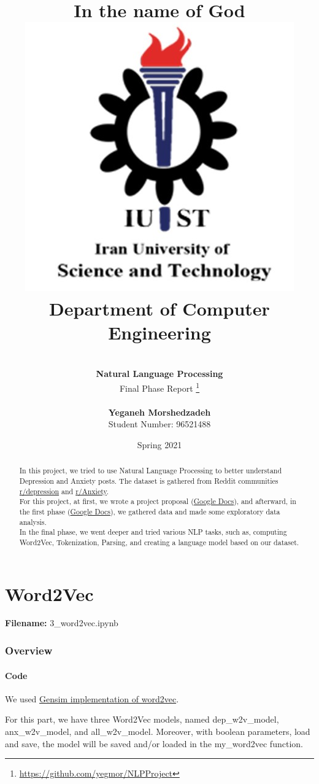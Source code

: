 \documentclass[12pt, a4paper]{article}
\title{
	{\Huge \textbf{In the name of God}}
	\\[20pt]
	\includegraphics[width=0.5\linewidth]{../assets/IUST_logo_color_eng.jpg} \\
	{\normalsize Department of Computer Engineering}
}
\author{
	\\[10pt]
	\textbf{{\LARGE Natural Language Processing}}
	\\[10pt]
	\LARGE Final Phase Report
	\thanks{\url{https://github.com/yegmor/NLPProject}}
	
	\\[30pt]
	\textbf{Yeganeh Morshedzadeh}
	\\[5pt]
	Student Number: 96521488
}
\date{Spring 2021}
\begin{document}
	
	\maketitle
	
	\clearpage
	\tableofcontents
	\newpage
	
	\listoffigures
	\newpage
	
	\listoftables
	\newpage
	
	\begin{abstract}
		In this project, we tried to use Natural Language Processing to better understand Depression and Anxiety posts. The dataset is gathered from Reddit communities \href{https://www.reddit.com/r/depression}{r/depression} and \href{https://www.reddit.com/r/Anxiety}{r/Anxiety}.
		\\[10pt]
		
		For this project, at first, we wrote a project proposal (\href{https://docs.google.com/document/d/1tHGEmEgn8-sp8MD72d8NjnZsq-GpVupzsMWgnqaGi-Y/edit?usp=sharing}{Google Docs}), and afterward, in the first phase (\href{https://docs.google.com/document/d/1Jc2ELhweU01Tbf0WalU7wVQABdAV4w50mhQnmMpU2mM/edit?usp=sharing}{Google Docs}), we gathered data and made some exploratory data analysis. 
		\\[10pt]
		
		In the final phase, we went deeper and tried various NLP tasks, such as, computing Word2Vec, Tokenization, Parsing, and creating a language model based on our dataset.
	\end{abstract}
	
	\newpage
	\part{Word2Vec}
	\large{\textbf{Filename:} 3\_word2vec.ipynb}
	\section{Overview}
	
	\subsection{Code}
	We used \href{https://radimrehurek.com/gensim/models/word2vec.html}{Gensim implementation of word2vec}. 
	
	For this part, we have three Word2Vec models, named dep\_w2v\_model, anx\_w2v\_model, and all\_w2v\_model. Moreover, with boolean parameters, load and save, the model will be saved and/or loaded in the my\_word2vec function.
	
\end{document}
